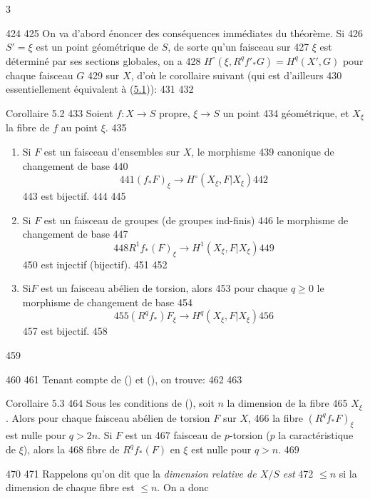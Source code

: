 3	\documentclass[10pt]{../fichiers-configuration-latex/smfart}
\begin{document}
   424	
   425	On va d'abord énoncer des conséquences immédiates du théorème. Si
   426	$S'=\xi$ est un point géométrique de $S$, de sorte qu'un faisceau sur
   427	$\xi$ est déterminé par ses sections globales, on a
   428	$H^{\circ}(\xi,R^q{f'}_{\ast}G)=H^q(X',G)$ pour chaque faisceau $G$
   429	sur $X$, d'où le corollaire suivant (qui est d'ailleurs
   430	essentiellement équivalent à (\hyperref[XII.thm5.1]{5.1})):
   431	
   432	\begin{enonce*}{Corollaire 5.2}
   433	Soient $f:X\rightarrow S$ propre, $\xi\rightarrow S$ un point
   434	géométrique, et $X_{\xi}$ la fibre de $f$ au point $\xi$.
   435	\begin{enumerate}
   436	\renewcommand{\theenumi}{\roman{enumi}}
   437	\renewcommand{\labelenumi}{(\theenumi)}
   438	\item Si $F$ est un faisceau d'ensembles sur $X$, le morphisme
   439	  canonique de changement de base
   440	$$
   441	(f_{\ast}F)_{\xi}\longrightarrow H^{\circ}(X_{\xi},F| X_{\xi})
   442	$$
   443	est bijectif.
   444	
   445	\item Si $F$ est un faisceau de groupes (\resp de groupes ind-finis)
   446	  le morphisme de changement de base
   447	$$
   448	R^1f_{\ast}(F)_{\xi}\longrightarrow H^1(X_{\xi},F| X_{\xi})
   449	$$
   450	est injectif (\resp bijectif).
   451	
   452	\item Si\pageoriginale $F$ est un faisceau abélien de torsion, alors
   453	  pour chaque $q\geq 0$ le morphisme de changement de base
   454	$$
   455	(R^qf_{\ast})F_{\xi}\longrightarrow H^q(X_{\xi},F| X_{\xi})
   456	$$
   457	est bijectif.
   458	\end{enumerate}
   459	\end{enonce*}
   460	
   461	Tenant compte de () et (), on trouve:
   462	
   463	\begin{enonce*}{Corollaire 5.3}
   464	Sous les conditions de (), soit $n$ la dimension de la fibre
   465	$X_{\xi}$. Alors pour chaque faisceau abélien de torsion $F$ sur $X$,
   466	la fibre $(R^qf_{\ast}F)_{\xi}$ est nulle pour $q>2n$. Si $F$ est un
   467	faisceau de $p$-torsion ($p$ la caractéristique de $\xi$), alors la
   468	fibre de $R^qf_{\ast}(F)$ en $\xi$ est nulle pour $q>n$.
   469	\end{enonce*}
   470	
   471	Rappelons qu'on dit que la \emph{dimension relative de $X/S$ est}
   472	$\leq n$ si la dimension de chaque fibre est $\leq n$. On a donc
\end{document}
